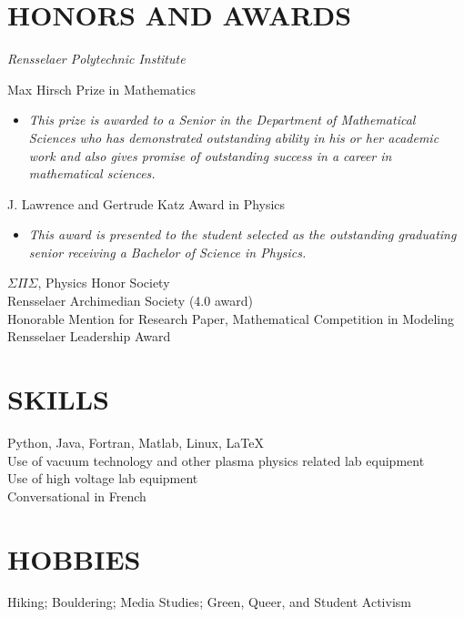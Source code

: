 \documentclass[margin]{rpires}
\begin{document}
\begin{resume}
    
\section{HONORS AND AWARDS} {\sl Rensselaer Polytechnic Institute}

                Max Hirsch Prize in Mathematics
                \begin{itemize}
                    \item[] {\sl This prize is awarded to a Senior in the Department of Mathematical Sciences who has demonstrated outstanding ability in his or her academic work and also gives promise of outstanding success in a career in mathematical sciences.}
                \end{itemize}
                \vspace{-0.4cm}
                J. Lawrence and Gertrude Katz Award in Physics
                \begin{itemize} 
                    \item[] {\sl This award is presented to the student selected as the outstanding graduating senior receiving a Bachelor of Science in Physics.}
                \end{itemize}
                \vspace{-0.4cm}
                $\Sigma \Pi \Sigma$, Physics Honor Society \\
                Rensselaer Archimedian Society (4.0 award) \\
                Honorable Mention for Research Paper,       Mathematical Competition in Modeling \\
                Rensselaer Leadership Award 
 
\section{SKILLS}
Python, Java, Fortran, Matlab, Linux, \LaTeX\\
Use of vacuum technology and other plasma physics related lab equipment\\
Use of high voltage lab equipment\\
Conversational in French\\%

 
\section{HOBBIES}
Hiking; Bouldering; Media Studies; Green, Queer, and Student Activism
 
\end{resume} 
\end{document}
